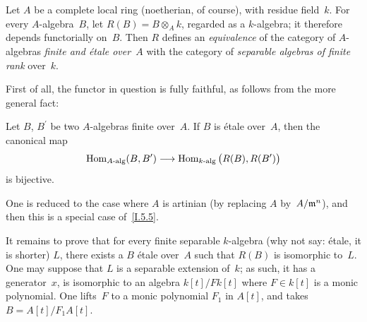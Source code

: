 \begin{theorem}
\label{I.6.1}
Let $A$ be a complete local ring (noetherian, of course), with
residue field~$k$. For every $A$-algebra~$B$, let
$R(B)=B\otimes_A k$, regarded as a $k$-algebra; it therefore
depends functorially on~$B$. Then $R$ defines an
\emph{equivalence} of the category of $A$-algebras
\emph{finite and \'etale over~$A$} with the category of
\emph{separable algebras of finite rank} over~$k$.
\end{theorem}

First of all, the functor in question is fully faithful, as
follows from the more general fact:

\begin{corollary}
\label{I.6.2}
Let $B$, $B^\prime$ be two $A$-algebras finite over~$A$. If $B$
is \'etale over~$A$, then the canonical map
\[
\Hom_{\textup{$A$-alg}}(B,B^\prime)\to
\Hom_{\textup{$k$-alg}}\big(R(B),R(B^\prime)\big)
\]
is bijective.
\end{corollary}

One is reduced to the case where $A$ is artinian (by replacing
$A$ by~$A/\mathfrak{m}^n$), and then this is a special case
of~\ref{I.5.5}.

It remains to prove that for every finite separable $k$-algebra
(why not say: \'etale, it is shorter) $L$, there exists a $B$
\'etale over~$A$ such that $R(B)$ is isomorphic to~$L$. One may
suppose that $L$ is a separable extension of~$k$; as such, it
has a generator~$x$, \ie is isomorphic to an algebra $k[t]/Fk[t]$
where $F\in k[t]$ is a monic polynomial. One lifts~$F$ to a
monic polynomial $F_1$ in $A[t]$, and takes $B=A[t]/F_1A[t]$.
